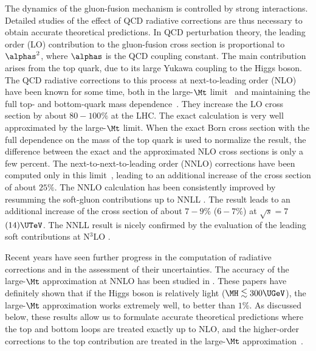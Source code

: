 The dynamics of the gluon-fusion mechanism is controlled by strong interactions. Detailed studies
of the effect of QCD radiative corrections are thus necessary to obtain accurate theoretical predictions.
In QCD perturbation theory, the leading order (LO) contribution \cite{Georgi:1977gs}
to the gluon-fusion cross section is proportional to $\alphas^2$, where $\alphas$ is the QCD coupling constant.  The 
main contribution arises from the top quark, due to its large Yukawa coupling to the Higgs boson.  The QCD radiative corrections to this 
process at next-to-leading order (NLO) have been known for some time, both in the large-$\Mt$ limit~\cite{Dawson:1991zj,Djouadi:1991tka} and maintaining the full top- and bottom-quark mass dependence~\cite{Graudenz:1992pv,Spira:1995rr}. They increase the 
LO cross section by about $80{-}100\%$ at the LHC.  The exact calculation is very well approximated by the
large-$\Mt$ limit. When the exact Born cross section with the full dependence on the mass of the top quark is used
to normalize the result, the difference between the exact and the approximated NLO
cross sections is only a few percent.  The next-to-next-to-leading order (NNLO) corrections have been computed only in this 
limit~\cite{Harlander:2000mg,Catani:2001ic,Harlander:2001is,Harlander:2002wh,Anastasiou:2002yz,Ravindran:2003um,Blumlein:2005im},
leading to an additional increase of the cross section of about 
$25\%$.
The NNLO calculation has been consistently improved by resumming the soft-gluon contributions
up to NNLL \cite{Catani:2003zt}. The result leads to an additional
increase of the cross section of about $7{-}9\%$ ($6{-}7\%$) at
$\sqrt{s}=7$ $(14)\UTeV$.
The NNLL result is nicely confirmed by the evaluation of the leading soft contributions at N$^3$LO \cite{Moch:2005ky,Laenen:2005uz,Idilbi:2005ni,Ravindran:2005vv,Ravindran:2006cg}.

Recent years have seen further progress in the computation of radiative corrections and in the assessment
of their uncertainties. The accuracy of the large-$\Mt$ approximation at NNLO has been studied in
. These papers have definitely shown that if the Higgs 
boson is relatively light 
($\MH\lsim 300\UGeV$), the large-$\Mt$ approximation works extremely well,
to better than $1\%$. As discussed below, these results allow us to formulate accurate theoretical predictions where the top and bottom loops 
are treated exactly up to NLO, and the higher-order corrections to the top contribution
are treated in the large-$\Mt$ approximation~\cite{Anastasiou:2008tj}.

